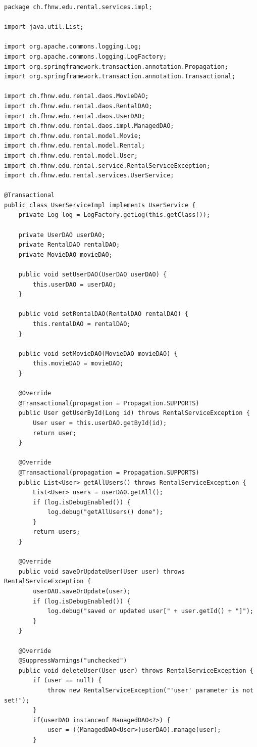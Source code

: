 \documentclass[a4paper,10pt]{scrreprt}
\begin{document}
\begin{lstlisting}[caption=UserService]
 package ch.fhnw.edu.rental.services.impl;

import java.util.List;

import org.apache.commons.logging.Log;
import org.apache.commons.logging.LogFactory;
import org.springframework.transaction.annotation.Propagation;
import org.springframework.transaction.annotation.Transactional;

import ch.fhnw.edu.rental.daos.MovieDAO;
import ch.fhnw.edu.rental.daos.RentalDAO;
import ch.fhnw.edu.rental.daos.UserDAO;
import ch.fhnw.edu.rental.daos.impl.ManagedDAO;
import ch.fhnw.edu.rental.model.Movie;
import ch.fhnw.edu.rental.model.Rental;
import ch.fhnw.edu.rental.model.User;
import ch.fhnw.edu.rental.service.RentalServiceException;
import ch.fhnw.edu.rental.services.UserService;

@Transactional
public class UserServiceImpl implements UserService {
	private Log log = LogFactory.getLog(this.getClass());
	
	private UserDAO userDAO;
	private RentalDAO rentalDAO;
	private MovieDAO movieDAO;

	public void setUserDAO(UserDAO userDAO) {
		this.userDAO = userDAO;
	}

	public void setRentalDAO(RentalDAO rentalDAO) {
		this.rentalDAO = rentalDAO;
	}

	public void setMovieDAO(MovieDAO movieDAO) {
		this.movieDAO = movieDAO;
	}

	@Override
	@Transactional(propagation = Propagation.SUPPORTS)	
	public User getUserById(Long id) throws RentalServiceException {
		User user = this.userDAO.getById(id);
		return user;
	}
	
	@Override
	@Transactional(propagation = Propagation.SUPPORTS)	
	public List<User> getAllUsers() throws RentalServiceException {
		List<User> users = userDAO.getAll();
		if (log.isDebugEnabled()) {
			log.debug("getAllUsers() done");
		}
		return users;
	}

	@Override
	public void saveOrUpdateUser(User user) throws RentalServiceException {
		userDAO.saveOrUpdate(user);
		if (log.isDebugEnabled()) {
			log.debug("saved or updated user[" + user.getId() + "]");
		}
	}

	@Override
	@SuppressWarnings("unchecked")
	public void deleteUser(User user) throws RentalServiceException {
		if (user == null) {
			throw new RentalServiceException("'user' parameter is not set!");
		}
		if(userDAO instanceof ManagedDAO<?>) {
			user = ((ManagedDAO<User>)userDAO).manage(user);
		}


\end{lstlisting}
\end{document}
